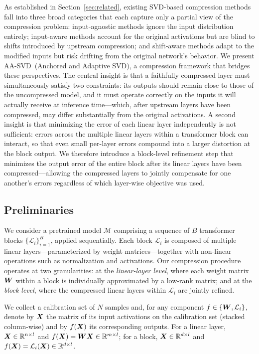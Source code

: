 \documentclass[10pt]{article} %
\theoremstyle{definition}
\theoremstyle{remark}
\newcommand{\ourmethod}{{\textsc{AA-SVD}}}
\begin{document}
As established in Section~\ref{sec:related}, existing SVD-based compression methods fall into three broad categories that each capture only a partial view of the compression problem: input-agnostic methods ignore the input distribution entirely; input-aware methods account for the original activations but are blind to shifts introduced by upstream compression; and shift-aware methods adapt to the modified inputs but risk drifting from the original network's behavior.
We present \ourmethod~(Anchored and Adaptive SVD), a compression framework that bridges these perspectives.
The central insight is that a faithfully compressed layer must simultaneously satisfy two constraints: its outputs should remain close to those of the uncompressed model, and it must operate correctly on the inputs it will actually receive at inference time—which, after upstream layers have been compressed, may differ substantially from the original activations.
A second insight is that minimizing the error of each linear layer independently is not sufficient: errors across the multiple linear layers within a transformer block can interact, so that even small per-layer errors compound into a larger distortion at the block output.
We therefore introduce a block-level refinement step that minimizes the output error of the entire block after its linear layers have been compressed—allowing the compressed layers to jointly compensate for one another's errors regardless of which layer-wise objective was used.

\subsection{Preliminaries}
\label{sec:prelim}

We consider a pretrained model $\mathcal{M}$ comprising a sequence of $B$ transformer blocks $\{\mathcal{L}_i\}_{i=1}^{B}$, applied sequentially.
Each block $\mathcal{L}_i$ is composed of multiple linear layers—parameterized by weight matrices—together with non-linear operations such as normalization and activations.
Our compression procedure operates at two granularities: at the \emph{linear-layer level}, where each weight matrix ${\bm{W}}$ within a block is individually approximated by a low-rank matrix; and at the \emph{block level}, where the compressed linear layers within $\mathcal{L}_i$ are jointly refined.

We collect a calibration set of $N$ samples and, for any component $f \in \{{\bm{W}}, \mathcal{L}_i\}$, denote by ${\bm{X}}$ the matrix of its input activations on the calibration set (stacked column-wise) and by $f({\bm{X}})$ its corresponding outputs.
For a linear layer, ${\bm{X}} \in \mathbb{R}^{n \times l}$ and $f({\bm{X}}) = {\bm{W}}{\bm{X}} \in \mathbb{R}^{m \times l}$; for a block, ${\bm{X}} \in \mathbb{R}^{d \times l}$ and $f({\bm{X}}) = \mathcal{L}_i({\bm{X}}) \in \mathbb{R}^{d \times l}$.
\end{document}
